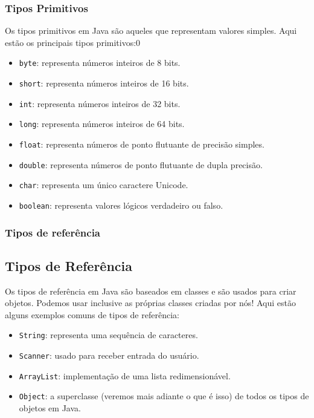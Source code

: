\begin{frame}
	\frametitle{Tipos Primitivos}
	\par Os tipos primitivos em Java são aqueles que representam valores simples. Aqui estão os principais tipos primitivos:0

	\begin{itemize}
		\item \texttt{byte}: representa números inteiros de 8 bits.
		\item \texttt{short}: representa números inteiros de 16 bits.
		\item \texttt{int}: representa números inteiros de 32 bits.
		\item \texttt{long}: representa números inteiros de 64 bits.
		\item \texttt{float}: representa números de ponto flutuante de precisão simples.
		\item \texttt{double}: representa números de ponto flutuante de dupla precisão.
		\item \texttt{char}: representa um único caractere Unicode.
		\item \texttt{boolean}: representa valores lógicos verdadeiro ou falso.
	\end{itemize}
\end{frame}

\begin{frame}
	\frametitle{Tipos de referência}
	\subsection{Tipos de Referência}
	
	\par Os tipos de referência em Java são baseados em classes e são usados para criar objetos. Podemos usar inclusive as próprias classes criadas por nós! Aqui estão alguns exemplos comuns de tipos de referência:
	
	\begin{itemize}
		\item \texttt{String}: representa uma sequência de caracteres.
		\item \texttt{Scanner}: usado para receber entrada do usuário.
		\item \texttt{ArrayList}: implementação de uma lista redimensionável.
		\item \texttt{Object}: a superclasse (veremos mais adiante o que é isso) de todos os tipos de objetos em Java.
	\end{itemize}
\end{frame}










